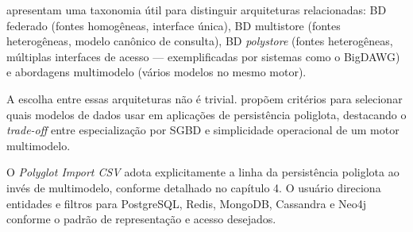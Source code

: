  apresentam uma taxonomia útil para distinguir arquiteturas
relacionadas: BD federado (fontes homogêneas, interface única), BD multistore (fontes
heterogêneas, modelo canônico de consulta), BD \textit{polystore} (fontes heterogêneas,
múltiplas interfaces de acesso --- exemplificadas por sistemas como o BigDAWG) e
abordagens multimodelo (vários modelos no mesmo motor).

A escolha entre essas arquiteturas não é trivial. 
propõem critérios para selecionar quais modelos de dados usar em aplicações de persistência
poliglota, destacando o \textit{trade-off} entre especialização por SGBD e simplicidade
operacional de um motor multimodelo.

O \textit{Polyglot Import CSV} adota explicitamente a linha da persistência poliglota ao
invés de multimodelo, conforme detalhado no capítulo 4. O usuário direciona entidades e
filtros para PostgreSQL, Redis, MongoDB, Cassandra e Neo4j conforme o padrão de
representação e acesso desejados.
